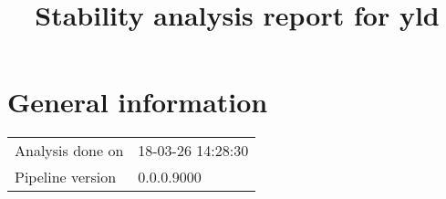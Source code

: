 \documentclass[a4paper,11pt]{article}\usepackage[]{graphicx}\usepackage[]{color}
\title{Stability analysis report for yld}%
\author{\vspace{-5ex}}
\date{\vspace{-5ex}}
\begin{document}
\maketitle
\singlespacing

\section{General information}
\begin{table}[ht]
\begin{flushleft}
\begin{tabular}{ll}
  Analysis done on & 18-03-26 14:28:30 \\ 
  Pipeline version & 0.0.0.9000 \\ 
  \end{tabular}
\label{general}
\end{flushleft}
\end{table}


\end{document}
